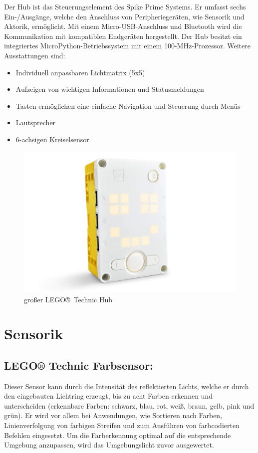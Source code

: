Der Hub ist das Steuerungselement des Spike Prime Systems. Er umfasst sechs Ein-/Ausgänge, welche den Anschluss von Peripheriegeräten, wie Sensorik und Aktorik, ermöglicht. Mit einem Micro-USB-Anschluss und Bluetooth wird die Kommunikation mit kompatiblen Endgeräten hergestellt. Der Hub besitzt ein integriertes MicroPython-Betriebssystem mit einem 100-MHz-Prozessor. 
Weitere Ausstattungen sind:
\begin{itemize}
	\item Individuell anpassbaren Lichtmatrix (5x5)
	\item Aufzeigen von wichtigen Informationen und Statusmeldungen
	\item Tasten ermöglichen eine einfache Navigation und Steuerung durch Menüs 
	\item Lautsprecher
	\item 6-achsigen Kreiselsensor
\end{itemize}

\begin{figure}[H]
	\centering
	\includegraphics[width=0.4\linewidth]{images/Hub}
	\caption{großer LEGO® Technic Hub}
	\label{fig:hub}
\end{figure}



\section{Sensorik}
\subsection*{LEGO® Technic Farbsensor:}
Dieser Sensor kann durch die Intensität des reflektierten Lichts, welche er durch den eingebauten Lichtring erzeugt, bis zu acht Farben erkennen und unterscheiden (erkennbare Farben: schwarz, blau, rot, weiß, braun, gelb, pink und grün).  Er wird vor allem bei Anwendungen, wie Sortieren nach Farben, Linienverfolgung von farbigen Streifen und zum Ausführen von farbcodierten Befehlen eingesetzt. Um die Farberkennung optimal auf die entsprechende Umgebung anzupassen, wird das Umgebungslicht zuvor ausgewertet.

